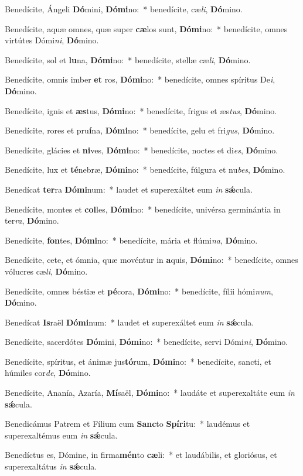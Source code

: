 \item Benedícite, Ángeli \textbf{Dó}mini, \textbf{Dó}\textbf{mi}no:~* benedícite, cæ\textit{li}, \textbf{Dó}mino.
\item Benedícite, aquæ omnes, quæ super \textbf{cæ}los sunt, \textbf{Dó}\textbf{mi}no:~* benedícite, omnes virtútes Dómi\textit{ni}, \textbf{Dó}mino.
\item Benedícite, sol et \textbf{lu}na, \textbf{Dó}\textbf{mi}no:~* benedícite, stellæ cæ\textit{li}, \textbf{Dó}mino.
\item Benedícite, omnis imber \textbf{et} ros, \textbf{Dó}\textbf{mi}no:~* benedícite, omnes spíritus De\textit{i}, \textbf{Dó}mino.
\item Benedícite, ignis et \textbf{æs}tus, \textbf{Dó}\textbf{mi}no:~* benedícite, frigus et æs\textit{tus}, \textbf{Dó}mino.
\item Benedícite, rores et pru\textbf{í}na, \textbf{Dó}\textbf{mi}no:~* benedícite, gelu et fri\textit{gus}, \textbf{Dó}mino.
\item Benedícite, glácies et \textbf{ni}ves, \textbf{Dó}\textbf{mi}no:~* benedícite, noctes et di\textit{es}, \textbf{Dó}mino.
\item Benedícite, lux et \textbf{té}nebræ, \textbf{Dó}\textbf{mi}no:~* benedícite, fúlgura et nu\textit{bes}, \textbf{Dó}mino.
\item Benedícat \textbf{ter}ra \textbf{Dó}\textbf{mi}num:~* laudet et superexáltet eum \textit{in} \textbf{sǽ}cula.
\item Benedícite, montes et \textbf{col}les, \textbf{Dó}\textbf{mi}no:~* benedícite, univérsa germinántia in ter\textit{ra}, \textbf{Dó}mino.
\item Benedícite, \textbf{fon}tes, \textbf{Dó}\textbf{mi}no:~* benedícite, mária et flúmi\textit{na}, \textbf{Dó}mino.
\item Benedícite, cete, et ómnia, quæ movéntur in \textbf{a}quis, \textbf{Dó}\textbf{mi}no:~* benedícite, omnes vólucres cæ\textit{li}, \textbf{Dó}mino.
\item Benedícite, omnes béstiæ et \textbf{pé}cora, \textbf{Dó}\textbf{mi}no:~* benedícite, fílii hómi\textit{num}, \textbf{Dó}mino.
\item Benedícat \textbf{Is}raël \textbf{Dó}\textbf{mi}num:~* laudet et superexáltet eum \textit{in} \textbf{sǽ}cula.
\item Benedícite, sacerdótes \textbf{Dó}mini, \textbf{Dó}\textbf{mi}no:~* benedícite, servi Dómi\textit{ni}, \textbf{Dó}mino.
\item Benedícite, spíritus, et ánimæ jus\textbf{tó}rum, \textbf{Dó}\textbf{mi}no:~* benedícite, sancti, et húmiles cor\textit{de}, \textbf{Dó}mino.
\item Benedícite, Ananía, Azaría, \textbf{Mí}saël, \textbf{Dó}\textbf{mi}no:~* laudáte et superexaltáte eum \textit{in} \textbf{sǽ}cula.
\item Benedicámus Patrem et Fílium cum \textbf{Sanc}to \textbf{Spí}\textbf{ri}tu:~* laudémus et superexaltémus eum \textit{in} \textbf{sǽ}cula.
\item Benedíctus es, Dómine, in firma\textbf{mén}to \textbf{cæ}li:~* et laudábilis, et gloriósus, et superexaltátus \textit{in} \textbf{sǽ}cula.

